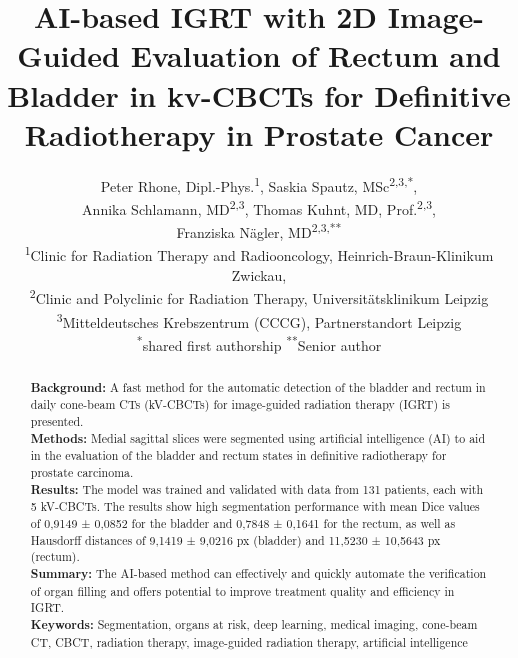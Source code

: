 \documentclass{article}
\begin{document}

\title{
 AI-based IGRT with 2D Image-Guided Evaluation of Rectum and Bladder in 
 kv-CBCTs for Definitive Radiotherapy in Prostate Cancer   }

\author{%
\begin{minipage}{\textwidth}
\centering
\small
Peter Rhone, Dipl.-Phys.\textsuperscript{1}, 
Saskia Spautz, MSc\textsuperscript{2,3,*},\\ 
Annika Schlamann, MD\textsuperscript{2,3}, 
Thomas Kuhnt, MD, Prof.\textsuperscript{2,3},\\ 
Franziska Nägler, MD\textsuperscript{2,3,**} \\[1ex]
\footnotesize\textsuperscript{1}Clinic for Radiation Therapy and Radiooncology, Heinrich-Braun-Klinikum Zwickau, \\ 
\footnotesize\textsuperscript{2}Clinic and Polyclinic for Radiation Therapy, Universitätsklinikum Leipzig \\ 
\footnotesize\textsuperscript{3}Mitteldeutsches Krebszentrum (CCCG), Partnerstandort Leipzig \\ 
\footnotesize\textsuperscript{*}shared first authorship
\footnotesize\textsuperscript{**}Senior author
\end{minipage}%
}
\maketitle 

\vspace{0.5cm}

\begin{abstract}
\noindent
\textbf{Background:} A fast method for the automatic detection of the bladder and
    rectum in daily cone-beam CTs (kV-CBCTs) for image-guided radiation therapy
    (IGRT) is presented. \\ \textbf{Methods:} Medial sagittal slices were
    segmented using artificial intelligence (AI) to aid in the evaluation 
    of the bladder and rectum states in definitive radiotherapy for prostate
    carcinoma. \\ \textbf{Results:} The model was trained and validated with
    data from 131
    patients, each with 5 kV-CBCTs. The results show high segmentation
    performance with mean Dice values of 0,9149 ± 0,0852 for the bladder and
    0,7848 ± 0,1641 for the rectum, as well as Hausdorff distances of 9,1419 ±
    9,0216 px (bladder) and 11,5230 ± 10,5643 px (rectum). \\ \textbf{Summary:}
    The AI-based method can effectively and quickly automate the verification
    of organ filling and offers potential to improve treatment quality and
    efficiency in IGRT. \\ \textbf{Keywords:} Segmentation, organs at risk,
    deep learning, medical imaging, cone-beam CT, CBCT, radiation therapy,
    image-guided radiation therapy, artificial intelligence
\end{abstract}
\end{document}
